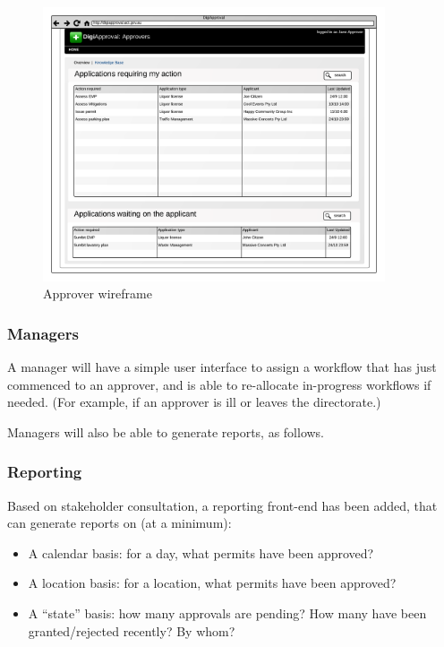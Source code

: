 \documentclass[12pt,a4paper,twosided]{article}
\begin{document}
\begin{figure}[htbp]
\centering
\includegraphics[width=0.9\textwidth]{./imgs/approver-wireframe.png}
\caption{Approver wireframe}
\end{figure}

\subsubsection{Managers}

A manager will have a simple user interface to assign a workflow that
has just commenced to an approver, and is able to re-allocate
in-progress workflows if needed. (For example, if an approver is ill or
leaves the directorate.)

Managers will also be able to generate reports, as follows.

\subsubsection{Reporting}

Based on stakeholder consultation, a reporting front-end has been added,
that can generate reports on (at a minimum):

\begin{itemize}
\itemsep1pt\parskip0pt
\item
  A calendar basis: for a day, what permits have been approved?
\item
  A location basis: for a location, what permits have been approved?
\item
  A ``state'' basis: how many approvals are pending? How many have been
  granted/rejected recently? By whom?
\end{itemize}
\end{document}
